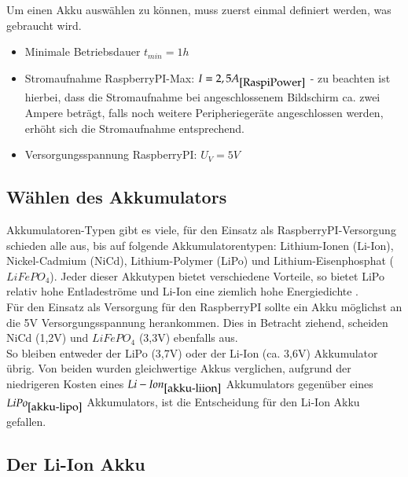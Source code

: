 \documentclass[12pt,a4paper]{article}
\begin{document}
Um einen Akku auswählen zu können, muss zuerst einmal definiert werden, was gebraucht wird.\\
\begin{itemize}
	\item{Minimale Betriebsdauer $t_{min}= 1h$}
	\item{Stromaufnahme RaspberryPI-Max: $I=2,5A_{\cite{RaspiPower}}$ - zu beachten ist hierbei, dass die Stromaufnahme bei angeschlossenem Bildschirm ca. zwei Ampere beträgt, falls noch weitere Peripheriegeräte angeschlossen werden, erhöht sich die Stromaufnahme entsprechend.}
	\item{Versorgungsspannung RaspberryPI: $U_V = 5V$}
\end{itemize}

\subsection{Wählen des Akkumulators}
\label{SUBSEC:CHOOSE-AKKU}

Akkumulatoren-Typen gibt es viele, für den Einsatz als RaspberryPI-Versorgung schieden alle aus, bis auf folgende Akkumulatorentypen: Lithium-Ionen (Li-Ion), Nickel-Cadmium (NiCd),  Lithium-Polymer (LiPo) und Lithium-Eisenphosphat ($LiFePO_4$). Jeder dieser Akkutypen bietet verschiedene Vorteile, so bietet LiPo relativ hohe Entladeströme und Li-Ion eine ziemlich hohe Energiedichte \cite{wiki:akku}. \\
Für den Einsatz als Versorgung für den RaspberryPI sollte ein Akku möglichst an die 5V Versorgungsspannung herankommen. Dies in Betracht ziehend, scheiden NiCd (1,2V) und $LiFePO_4$ (3,3V) ebenfalls aus. \\
So bleiben entweder der LiPo (3,7V) oder der Li-Ion (ca. 3,6V) Akkumulator übrig. Von beiden wurden gleichwertige Akkus verglichen, aufgrund der niedrigeren Kosten eines $Li-Ion_{\cite{akku-liion}}$ Akkumulators gegenüber eines $LiPo_{\cite{akku-lipo}}$ Akkumulators, ist die Entscheidung für den Li-Ion Akku gefallen.

\subsection{Der Li-Ion Akku}
\label{SUBSEC:LIION}
\end{document}
